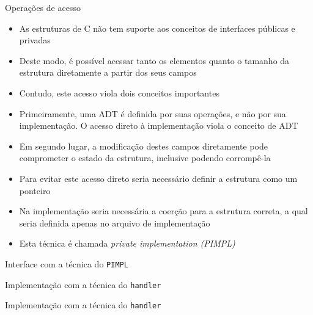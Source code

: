 \begin{frame}[fragile]{Operações de acesso}

    \begin{itemize}
        \item As estruturas de C não tem suporte aos conceitos de interfaces públicas e privadas

        \item Deste modo, é possível acessar tanto os elementos quanto o tamanho da estrutura
        diretamente a partir dos seus campos

        \item Contudo, este acesso viola dois conceitos importantes

        \item Primeiramente, uma ADT é definida por suas operações, e não por sua implementação.
        O acesso direto à implementação viola o conceito de ADT

        \item Em segundo lugar, a modificação destes campos diretamente pode comprometer o estado
        da estrutura, inclusive podendo corrompê-la

        \item Para evitar este acesso direto seria necessário definir a estrutura como um ponteiro

        \item Na implementação seria necessária a coerção para a estrutura correta, a qual seria 
        definida apenas no arquivo de implementação

        \item Esta técnica é chamada \textit{private implementation (PIMPL)}
    \end{itemize}

\end{frame}

\begin{frame}[fragile]{Interface com a técnica do \texttt{PIMPL}}
\end{frame}

\begin{frame}[fragile]{Implementação com a técnica do \texttt{handler}}
\end{frame}

\begin{frame}[fragile]{Implementação com a técnica do \texttt{handler}}
\end{frame}

